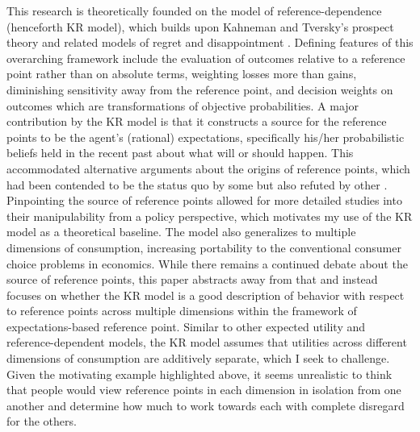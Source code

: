 \documentclass[12pt, letterpaper, DIV=11, numbers=noendperiod]{article}
\begin{document}
This research is theoretically founded on the \textcite{koszegi.2006.modelreferencedependenta} model of reference-dependence (henceforth KR model), which builds upon Kahneman and Tversky's \parencite*{kahneman.1979.prospecttheory,tversky.1991.lossaversion} prospect theory and related models of regret and disappointment \parencite[e.g.][]{bell.1982.regretdecision,bell.1985.disappointmentdecision,loomes.1982.regrettheory,loomes.1986.disappointmentdynamic,gul.1991.theorydisappointment}. Defining features of this overarching framework include the evaluation of outcomes relative to a reference point rather than on absolute terms, weighting losses more than gains, diminishing sensitivity away from the reference point, and decision weights on outcomes which are transformations of objective probabilities. A major contribution by the KR model is that it constructs a source for the reference points to be the agent's (rational) expectations, specifically his/her probabilistic beliefs held in the recent past about what will or should happen. This accommodated alternative arguments about the origins of reference points, which had been contended to be the status quo by some \parencite[e.g.][]{genesove.2001.lossaversion,kahneman.1990.experimentaltests} but also refuted by other \parencite[e.g.][]{plott.2005.willingnesspay,tversky.1991.lossaversion}. Pinpointing the source of reference points allowed for more detailed studies into their manipulability from a policy perspective, which motivates my use of the KR model as a theoretical baseline. The model also generalizes to multiple dimensions of consumption, increasing portability to the conventional consumer choice problems in economics. While there remains a continued debate about the source of reference points, this paper abstracts away from that and instead focuses on whether the KR model is a good description of behavior with respect to reference points across multiple dimensions within the framework of expectations-based reference point. Similar to other expected utility and reference-dependent models, the KR model assumes that utilities across different dimensions of consumption are additively separate, which I seek to challenge. Given the motivating example highlighted above, it seems unrealistic to think that people would view reference points in each dimension in isolation from one another and determine how much to work towards each with complete disregard for the others.
\end{document}
